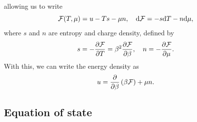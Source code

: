 %
allowing us to write
%
\begin{equation}
    \mathcal{F}(T, \mu) = u - Ts - \mu n, \quad
    \dd \mathcal{F} = -s \dd T - n \dd \mu,
\end{equation}
% 
where $s$ and $n$ are entropy and charge density, defined by
%
\begin{equation}
    s = - \pdv{\mathcal{F}}{T} = \beta^2 \pdv{\mathcal{F}}{\beta}, \quad
    n = - \pdv{\mathcal{F}}{\mu}.
\end{equation}
%
With this, we can write the energy density as~\autocite{andersenIntroductionStatisticalMechanics2012}
%
\begin{equation}
    u = \pdv{}{\beta} \left(\beta \mathcal{F}\right) + \mu n.
\end{equation}


\subsection{Equation of state}

